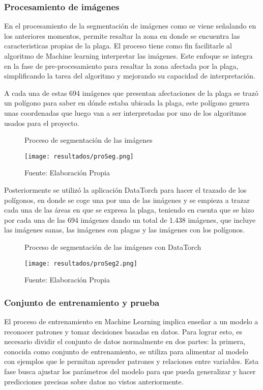 \subsubsection{Procesamiento de imágenes}

En el procesamiento de la segmentación de imágenes como se viene señalando en los anteriores momentos, permite resaltar la zona en donde se encuentra las caracteristicas propias de la plaga. El proceso tiene como fin facilitarle al algoritmo de Machine learning interpretar las imágenes. Este enfoque se integra en la fase de pre-procesamiento para resaltar la zona afectada por la plaga, simplificando la tarea del algoritmo y mejorando su capacidad de interpretación.

A cada una de estas 694 imágenes que presentan afectaciones de la plaga se trazó un polígono para saber en dónde estaba ubicada la plaga, este polígono genera unas coordenadas que luego van a ser interpretadas por uno de los algoritmos usados para el proyecto. 

\begin{figure}[h]
\centering
\caption{Proceso de segmentación de las imágenes}
\texttt{[image: resultados/proSeg.png]}
\caption*{\footnotesize Fuente: Elaboración Propia}
\label{fig:figuraProSeg}
\end{figure}

Posteriormente se utilizó la aplicación DataTorch para hacer el trazado de los polígonos, en donde se coge una por una de las imágenes y se empieza a trazar cada una de las áreas en que se expresa la plaga, teniendo en cuenta que se hizo por cada una de las 694 imágenes dando un total de 1.438 imágenes, que incluye las imágenes sanas, las imágenes con plagas y las imágenes con los polígonos.

\begin{figure}[h]
\centering
\caption{Proceso de segmentación de las imágenes con DataTorch}
\texttt{[image: resultados/proSeg2.png]}
\caption*{\footnotesize Fuente: Elaboración Propia}
\label{fig:figuraProSegDatatorch}
\end{figure}


\newpage

\subsubsection{Conjunto de entrenamiento y prueba}

El proceso de entrenamiento en Machine Learning implica enseñar a un modelo a reconocer patrones y tomar decisiones basadas en datos. Para lograr esto, es necesario dividir el conjunto de datos normalmente en dos partes: la primera, conocida como conjunto de entrenamiento, se utiliza para alimentar al modelo con ejemplos que le permitan aprender patrones y relaciones entre variables. Esta fase busca ajustar los parámetros del modelo para que pueda generalizar y hacer predicciones precisas sobre datos no vistos anteriormente.


